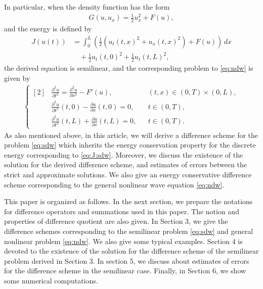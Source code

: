 \documentclass[dvipdfmx-if-dvi,autodetect-engine,ja=standard]{amsart}
\numberwithin{equation}{section} %
\begin{document}
In particular, when the density function has the form
\begin{align}
    G(u,u_x) = \frac{1}{2} u_x^2 + F(u),
\end{align}
and the energy is defined by
\begin{align}\label{eq:J:sdw}
    J(u(t))
    &=  \int_0^L
    \left(
    \frac{1}{2} \left( u_t(t,x)^2 + u_x(t,x)^2 \right) + F(u) \right) \,dx \\
    &\quad + \frac{1}{2}u_t(t,0)^2 + \frac{1}{2}u_t(t,L)^2,
\end{align}
the derived equation is semilinear, and the
corresponding problem to \eqref{eq:ndw} is given by
\begin{align}\label{eq:sdw}
    \left\{ \begin{aligned}[2]
    &\frac{\partial^2 u}{\partial t^2} = \frac{\partial^2 u}{\partial x^2} - F'(u),
    &&(t,x) \in (0,T)\times (0,L),\\
    &\frac{\partial^2 u}{\partial t^2}(t,0)
    - \frac{\partial u}{\partial x}(t,0) = 0,
    &&t\in (0,T),\\
    &\frac{\partial^2 u}{\partial t^2}(t,L)
    + \frac{\partial u}{\partial x}(t,L) = 0,
    &&t\in (0,T).
    \end{aligned}\right.
\end{align}
As also mentioned above, in this article, we will derive
a difference scheme for the problem \eqref{eq:sdw}
which inherits the energy conservation property
for the discrete energy corresponding to \eqref{eq:J:sdw}.
Moreover, we discuss the existence of the solution
for the derived difference scheme,
and estimates of errors between
the strict and approximate solutions.
We also give an energy conservative difference scheme
corresponding to the general nonlinear wave equation
\eqref{eq:ndw}.

This paper is organized as follows.
In the next section, we prepare
the notations for difference operators and summations
used in this paper.
The notion and properties of difference quotient
are also given.
In Section 3, we give
the difference schemes corresponding to the 
semilinear problem \eqref{eq:sdw}
and general nonlinear problem \eqref{eq:ndw}.
We also give some typical examples.
Section 4 is devoted to
the existence of the solution for
the difference scheme of the semilinear problem
derived in Section 3.
In section 5, we discuss about
estimates of errors for 
the difference scheme in the semilinear case.
Finally, in Section 6,
we show some numerical computations.
\end{document}
